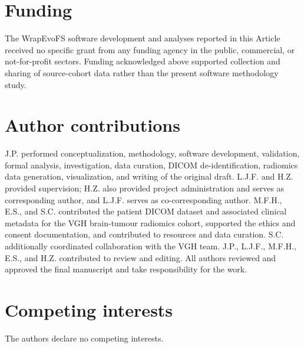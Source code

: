 \section*{Funding}

The WrapEvoFS software development and analyses reported in this Article received no specific grant from any funding agency in the public, commercial, or not-for-profit sectors. Funding acknowledged above supported collection and sharing of source-cohort data rather than the present software methodology study.

\section*{Author contributions}

J.P. performed conceptualization, methodology, software development, validation, formal analysis, investigation, data curation, DICOM de-identification, radiomics data generation, visualization, and writing of the original draft. L.J.F. and H.Z. provided supervision; H.Z. also provided project administration and serves as corresponding author, and L.J.F. serves as co-corresponding author. M.F.H., E.S., and S.C. contributed the patient DICOM dataset and associated clinical metadata for the VGH brain-tumour radiomics cohort, supported the ethics and consent documentation, and contributed to resources and data curation. S.C. additionally coordinated collaboration with the VGH team. J.P., L.J.F., M.F.H., E.S., and H.Z. contributed to review and editing. All authors reviewed and approved the final manuscript and take responsibility for the work.

\section*{Competing interests}

The authors declare no competing interests.
